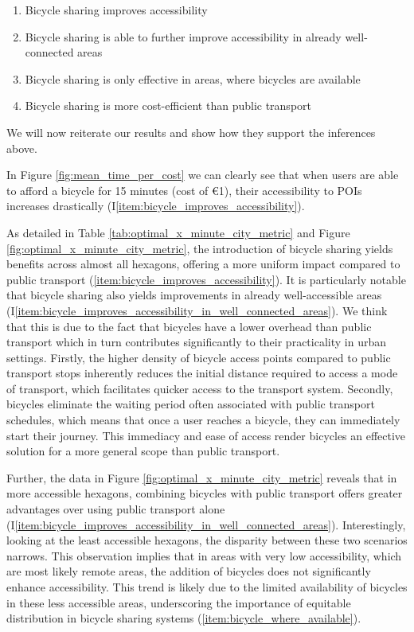 \begin{enumerate}
  \renewcommand{\labelenumi}{I\theenumi.}
  \item Bicycle sharing improves accessibility \label{item:bicycle_improves_accessibility}
  \item Bicycle sharing is able to further improve accessibility in already well-connected areas \label{item:bicycle_improves_accessibility_in_well_connected_areas}
  \item Bicycle sharing is only effective in areas, where bicycles are available \label{item:bicycle_where_available}
  \item Bicycle sharing is more cost-efficient than public transport \label{item:bicycle_more_cost_efficient_than_pt}
\end{enumerate}

We will now reiterate our results and show how they support the inferences above.

In Figure \ref{fig:mean_time_per_cost} we can clearly see that when users are able to afford a bicycle for 15 minutes (cost of \euro{1}), their accessibility to POIs increases drastically (I\ref{item:bicycle_improves_accessibility}).

As detailed in Table \ref{tab:optimal_x_minute_city_metric} and Figure \ref{fig:optimal_x_minute_city_metric}, the introduction of bicycle sharing yields benefits across almost all hexagons, offering a more uniform impact compared to public transport (\ref{item:bicycle_improves_accessibility}).
It is particularly notable that bicycle sharing also yields improvements in already well-accessible areas (I\ref{item:bicycle_improves_accessibility_in_well_connected_areas}).
We think that this is due to the fact that bicycles have a lower overhead than public transport which in turn contributes significantly to their practicality in urban settings.
Firstly, the higher density of bicycle access points compared to public transport stops inherently reduces the initial distance required to access a mode of transport, which  facilitates quicker access to the transport system. 
Secondly, bicycles eliminate the waiting period often associated with public transport schedules, which means that once a user reaches a bicycle, they can immediately start their journey. 
This immediacy and ease of access render bicycles an effective solution for a more general scope than public transport.

Further, the data in Figure \ref{fig:optimal_x_minute_city_metric} reveals that in more accessible hexagons, combining bicycles with public transport offers greater advantages over using public transport alone (I\ref{item:bicycle_improves_accessibility_in_well_connected_areas}).
Interestingly, looking at the least accessible hexagons, the disparity between these two scenarios narrows. 
This observation implies that in areas with very low accessibility, which are most likely remote areas, the addition of bicycles does not significantly enhance accessibility.
This trend is likely due to the limited availability of bicycles in these less accessible areas, underscoring the importance of equitable distribution in bicycle sharing systems (\ref{item:bicycle_where_available}).


